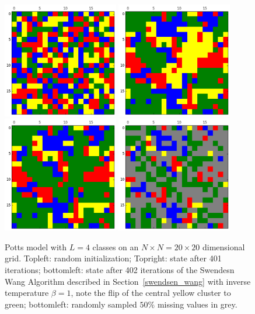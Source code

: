 \documentclass[12pt, twoside]{article}
\newcommand{\1}{\mathbb{1}}
\begin{document}
%
\begin{figure}
	\centering
	\includegraphics[width=0.45\textwidth]{plots/grid_initial.png}
	\includegraphics[width=0.45\textwidth]{plots/grid_b1_it401.png}
	\includegraphics[width=0.45\textwidth]{plots/grid_b1_it402.png}
	\includegraphics[width=0.45\textwidth]{plots/grid_b1_it402_missing.png}
	\caption{Potts model with $L = 4$ classes on an $N \times N = 20 \times 20$ dimensional grid. Topleft: random initialization; Topright: state after 401 iterations; bottomleft: state after 402 iterations of the Swendesn Wang Algorithm described in Section~\ref{swendsen_wang} with inverse temperature $\beta = 1$, note the flip of the central yellow cluster to green; bottomleft: randomly sampled $50\%$ missing values in grey.}
	\label{fig:potts_models}
\end{figure}
%
\end{document}
